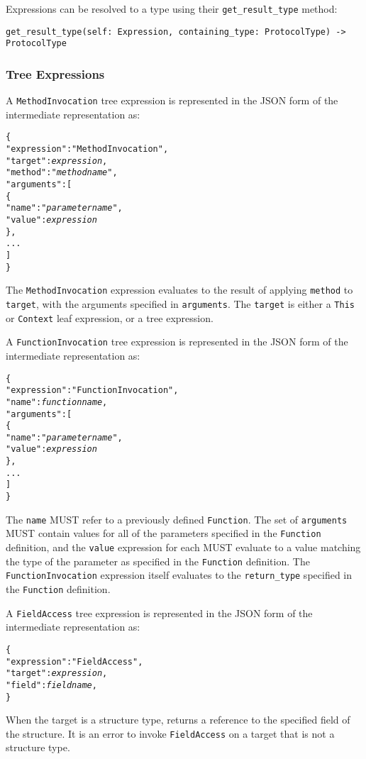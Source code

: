 \documentclass[10pt,twocolumn,a4paper]{article}
\newcommand{\code}[1]{\texttt{#1}}
\begin{document}
Expressions can be resolved to a type using their \code{get\_result\_type} method:

\code{get\_result\_type(self: Expression, containing\_type: ProtocolType) -> ProtocolType}

\subsubsection{Tree Expressions}

A \code{MethodInvocation} tree expression is represented in the JSON form of the
intermediate representation as:
\footnotesize
\begin{alltt}
  \{
    "expression"   : "MethodInvocation",
    "target"       : \emph{expression},
    "method"       : "\emph{method name}",
    "arguments"    : [
      \{
        "name"  : "\emph{parameter name}",
        "value" : \emph{expression}
      \},
      ...
    ]
  \}
\end{alltt}
\normalsize
The \code{MethodInvocation} expression evaluates to the result of applying \code{method}
to \code{target}, with the arguments specified in \code{arguments}. The \code{target} is
either a \code{This} or \code{Context} leaf expression, or a tree expression.

A \code{FunctionInvocation} tree expression is represented in the JSON form of the
intermediate representation as:
\footnotesize
\begin{alltt}
  \{
    "expression"   : "FunctionInvocation",
    "name"         : \emph{function name},
    "arguments"    : [
      \{
        "name"  : "\emph{parameter name}",
        "value" : \emph{expression}
      \},
      ...
    ]
  \}
\end{alltt}
\normalsize
The \code{name} MUST refer to a previously defined \code{Function}. The set
of \code{arguments} MUST contain values for all of the parameters specified
in the \code{Function} definition, and the \code{value} expression for each
MUST evaluate to a value matching the type of the parameter as specified in
the \code{Function} definition. The \code{FunctionInvocation} expression
itself evaluates to the \code{return\_type} specified in the
\code{Function} definition.

A \code{FieldAccess} tree expression is represented in the JSON form of the
intermediate representation as:
\footnotesize
\begin{alltt}
  \{
    "expression"  : "FieldAccess",
    "target"      : \emph{expression},
    "field"       : \emph{field name},
  \}
\end{alltt}
\normalsize
When the target is a structure type, returns a reference to the specified
field of the structure.
It is an error to invoke \code{FieldAccess} on a target that is not a
structure type.
\end{document}

